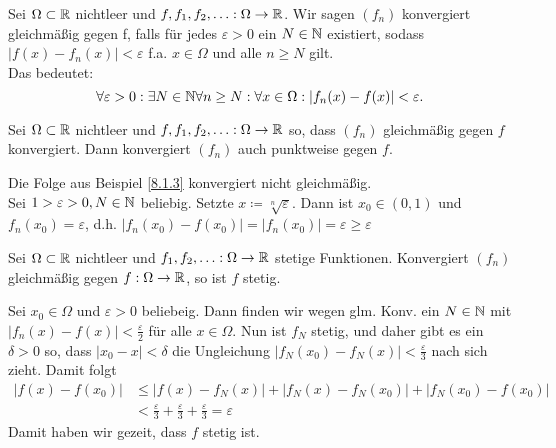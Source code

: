 \begin{subdefinition}
	Sei $ \Omega \subset \mathbb{R}  $ nichtleer und $ f, f_1, f_2, \dotsc : \Omega \to \mathbb{R}  $.
	Wir sagen $ (f_n) $ \textcolor{gadse-dark-green}{konvergiert gleichmäßig gegen} f, falls für jedes $ \varepsilon > 0 $ ein $ N \in \mathbb{N}  $ existiert, sodass $ |f(x) - f_n(x)| < \varepsilon  $ f.a. $ x \in \Omega $ und alle $ n \geq N $ gilt.\\
	Das bedeutet:
	\[
		\forall \varepsilon > 0: \exists N \in \mathbb{N} \forall n \geq N : \forall x \in \Omega: |f_n(x) - f(x)| < \varepsilon .
	\]
\end{subdefinition}

\begin{sublemma}
	Sei $ \Omega \subset \mathbb{R}  $ nichtleer und $ f, f_1, f_2, \dotsc : \Omega \to \mathbb{R}  $ so, dass $ (f_n) $ gleichmäßig gegen $ f $ konvergiert.
	Dann konvergiert $ (f_n) $ auch punktweise gegen $ f $.
\end{sublemma}

\begin{subexample}
	Die Folge aus Beispiel \ref{8.1.3} konvergiert nicht gleichmäßig.\\
	Sei $ 1 > \varepsilon > 0, N \in \mathbb{N}  $ beliebig. Setzte $ x \coloneqq \sqrt[n]{\varepsilon }   $. Dann ist $ x_0 \in (0, 1) $ und $ f_n(x_0) = \varepsilon  $, d.h. $ |f_n(x_0) - f(x_0)| = |f_n(x_0)| = \varepsilon \geq \varepsilon  $
\end{subexample}

\begin{subtheorem}
	Sei $ \Omega \subset \mathbb{R}  $ nichtleer und $ f_1, f_2, \dotsc : \Omega \to \mathbb{R}  $ stetige Funktionen.
	Konvergiert $ (f_n) $ gleichmäßig gegen $ f: \Omega \to \mathbb{R}  $, so ist $ f $ stetig.
\end{subtheorem}

\begin{subproof*}
	Sei $ x_0 \in \Omega $ und $ \varepsilon > 0 $ beliebeig. Dann finden wir wegen glm. Konv. ein $ N \in \mathbb{N} $
	mit $ |f_n(x) - f(x)| < \frac{ \varepsilon  }{ 2 }  $ für alle $ x \in \Omega $. Nun ist $ f_N $ stetig, und daher gibt es ein $ \delta > 0 $ so, dass $ \left| x_0 - x \right| < \delta $ die Ungleichung $ \left| f_N(x_0) - f_N(x) \right| < \frac{\varepsilon}{ 3 }  $ nach sich zieht. Damit folgt
	\begin{align*}
		\left| f(x) - f(x_0) \right| &\leq \left| f(x) - f_N(x) \right| + \left| f_N(x) - f_N(x_0) \right| + \left| f_N(x_0) - f(x_0) \right| \\
		~&< \frac{ \varepsilon }{ 3 } + \frac{ \varepsilon }{ 3 } + \frac{ \varepsilon }{ 3 } = \varepsilon 
	\end{align*}
	Damit haben wir gezeit, dass $ f $ stetig ist.
\end{subproof*}

